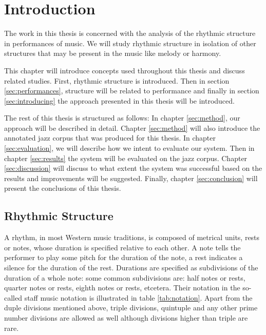 \chapter{Introduction}
\label{sec:introduction}

The work in this thesis is concerned with the analysis of the rhythmic structure in performances of music. We will study rhythmic structure in isolation of other structures that may be present in the music like melody or harmony.

This chapter will introduce concepts used throughout this thesis and discuss related studies. First, rhythmic structure is introduced. Then in section \ref{sec:performances}, structure will be related to performance and finally in section \ref{sec:introducing} the approach presented in this thesis will be introduced.

The rest of this thesis is structured as follows: In chapter \ref{sec:method}, our approach will be described in detail. Chapter \ref{sec:method} will also introduce the annotated jazz corpus that was produced for this thesis. In chapter \ref{sec:evaluation}, we will describe how we intent to evaluate our system. Then in chapter \ref{sec:results} the system will be evaluated on the jazz corpus. Chapter \ref{sec:discussion} will discuss to what extent the system was successful based on the results and improvements will be suggested. Finally, chapter \ref{sec:conclusion} will present the conclusions of this thesis.

\section{Rhythmic Structure}
\label{sec:structure}

A rhythm, in most Western music traditions, is composed of metrical units, rests or notes, whose duration is specified relative to each other. A note tells the performer to play some pitch for the duration of the note, a rest indicates a silence for the duration of the rest. Durations are specified as subdivisions of the duration of a whole note: some common subdivisions are: half notes or rests, quarter notes or rests, eighth notes or rests, etcetera. Their notation in the so-called staff music notation is illustrated in table \ref{tab:notation}. Apart from the duple divisions mentioned above, triple divisions, quintuple and any other prime number divisions are allowed as well although divisions higher than triple are rare. 

